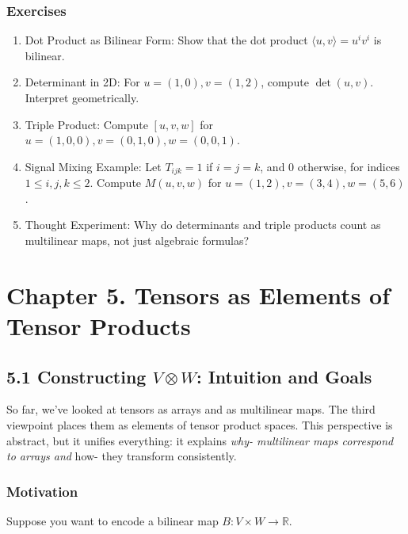 \documentclass[
  letterpaper,
  DIV=11,
  numbers=noendperiod]{scrreprt}
\begin{document}
\subsubsection{Exercises}\label{exercises-15}

\begin{enumerate}
\def\labelenumi{\arabic{enumi}.}
\item
  Dot Product as Bilinear Form: Show that the dot product
  \(\langle u,v \rangle = u^i v^i\) is bilinear.
\item
  Determinant in 2D: For \(u=(1,0), v=(1,2)\), compute \(\det(u,v)\).
  Interpret geometrically.
\item
  Triple Product: Compute \([u,v,w]\) for
  \(u=(1,0,0), v=(0,1,0), w=(0,0,1)\).
\item
  Signal Mixing Example: Let \(T_{ijk} = 1\) if \(i=j=k\), and \(0\)
  otherwise, for indices \(1 \leq i,j,k \leq 2\). Compute \(M(u,v,w)\)
  for \(u=(1,2), v=(3,4), w=(5,6)\).
\item
  Thought Experiment: Why do determinants and triple products count as
  multilinear maps, not just algebraic formulas?
\end{enumerate}

\section{Chapter 5. Tensors as Elements of Tensor
Products}\label{chapter-5.-tensors-as-elements-of-tensor-products}

\subsection{\texorpdfstring{5.1 Constructing \(V \otimes W\): Intuition
and
Goals}{5.1 Constructing V \textbackslash otimes W: Intuition and Goals}}\label{constructing-v-otimes-w-intuition-and-goals}

So far, we've looked at tensors as arrays and as multilinear maps. The
third viewpoint places them as elements of tensor product spaces. This
perspective is abstract, but it unifies everything: it explains
\emph{why- multilinear maps correspond to arrays and }how- they
transform consistently.

\subsubsection{Motivation}\label{motivation}

Suppose you want to encode a bilinear map
\(B: V \times W \to \mathbb{R}\).
\end{document}
